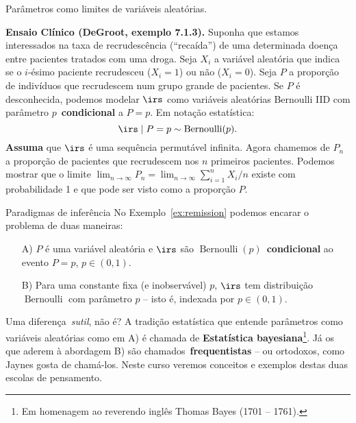 \begin{frame}{Parâmetros como limites de variáveis aleatórias.}
\begin{exemplo}
\label{ex:remission}
 \textbf{Ensaio Clínico (DeGroot, exemplo 7.1.3).}
 Suponha que estamos interessados na taxa de recrudescência (``recaída'') de uma determinada doença entre pacientes tratados com uma droga.
 Seja $X_i$ a variável aleatória que indica se o $i$-ésimo paciente recrudesceu ($X_i = 1$) ou não ($X_i = 0$).
 Seja $P$ a proporção de indivíduos que recrudescem num grupo grande de pacientes. 
 Se $P$ é desconhecida, podemos modelar $\irs$ como variáveis aleatórias Bernoulli IID com parâmetro $p$~\textbf{condicional} a $P = p$.
 Em notação estatística:
 \[ \irs \mid P = p \sim \operatorname{Bernoulli}(p).\]
  \textbf{Assuma} que $\irs$ é uma sequência permutável infinita.
  Agora chamemos de $P_n$ a proporção de pacientes que recrudescem nos $n$ primeiros pacientes.
  Podemos mostrar que o limite $\lim_{n \to \infty} P_n = \lim_{n \to \infty} \sum_{i=1}^n X_i/n$ existe com probabilidade 1 e que pode ser visto como a proporção $P$.
\end{exemplo}
\end{frame}
\begin{frame}{Paradigmas de inferência}
No Exemplo~\ref{ex:remission} podemos encarar o problema de duas maneiras:
\begin{itemize}
 \item[A)] $P$ é uma variável aleatória e $\irs$ são $\operatorname{Bernoulli}(p)$~\textbf{condicional} ao evento $P = p$, $p \in (0, 1)$.
 \item[B)] Para uma constante fixa (e inobservável) $p$, $\irs$ tem distribuição $\operatorname{Bernoulli}$ com parâmetro $p$ -- isto é, indexada por $p \in (0, 1)$.
\end{itemize}
Uma diferença~\textit{sutil}, não é?
A tradição estatística que entende parâmetros como variáveis aleatórias como em A) é chamada de \textbf{Estatística bayesiana}\footnote{Em homenagem ao reverendo inglês Thomas Bayes (1701 -- 1761).}.
Já os que aderem à abordagem B) são chamados~\textbf{frequentistas} -- ou ortodoxos, como Jaynes gosta de chamá-los.
Neste curso veremos conceitos e exemplos destas duas escolas de pensamento. 
\end{frame}
